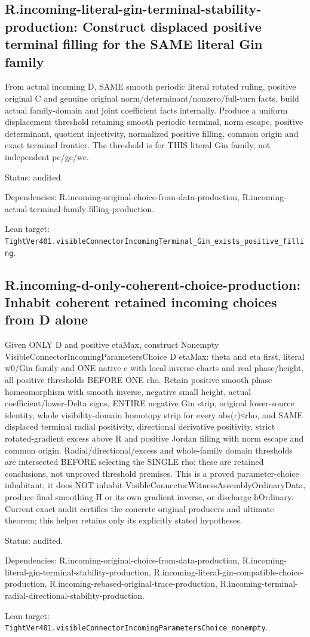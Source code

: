 \documentclass{article}
\begin{document}
\subsection*{R.incoming-literal-gin-terminal-stability-production: Construct displaced positive terminal filling for the SAME literal Gin family}
From actual incoming D, SAME smooth periodic literal rotated ruling, positive original C and genuine original norm/determinant/nonzero/full-turn facts, build actual family-domain and joint coefficient facts internally. Produce a uniform displacement threshold retaining smooth periodic terminal, norm escape, positive determinant, quotient injectivity, normalized positive filling, common origin and exact terminal frontier. The threshold is for THIS literal Gin family, not independent pc/gc/wc.
\par Status: audited.
\par Dependencies: R.incoming-original-choice-from-data-production, R.incoming-actual-terminal-family-filling-production.
\par Lean target: \texttt{TightVer401.visibleConnectorIncomingTerminal\_Gin\_exists\_positive\_filling}.
\subsection*{R.incoming-d-only-coherent-choice-production: Inhabit coherent retained incoming choices from D alone}
Given ONLY D and positive etaMax, construct Nonempty VisibleConnectorIncomingParametersChoice D etaMax: theta and eta first, literal w0/Gin family and ONE native e with local inverse charts and real phase/height, all positive thresholds BEFORE ONE rho. Retain positive smooth phase homeomorphism with smooth inverse, negative small height, actual coefficient/lower-Delta signs, ENTIRE negative Gin strip, original lower-source identity, whole visibility-domain homotopy strip for every abs(r)≤rho, and SAME displaced terminal radial positivity, directional derivative positivity, strict rotated-gradient excess above R and positive Jordan filling with norm escape and common origin. Radial/directional/excess and whole-family domain thresholds are intersected BEFORE selecting the SINGLE rho; these are retained conclusions, not unproved threshold premises. This is a proved parameter-choice inhabitant; it does NOT inhabit VisibleConnectorWitnessAssemblyOrdinaryData, produce final smoothing H or its own gradient inverse, or discharge hOrdinary. Current exact audit certifies the concrete original producers and ultimate theorem; this helper retains only its explicitly stated hypotheses.
\par Status: audited.
\par Dependencies: R.incoming-original-choice-from-data-production, R.incoming-literal-gin-terminal-stability-production, R.incoming-literal-gin-compatible-choice-production, R.incoming-rebased-original-trace-production, R.incoming-terminal-radial-directional-stability-production.
\par Lean target: \texttt{TightVer401.visibleConnectorIncomingParametersChoice\_nonempty}.
\end{document}
